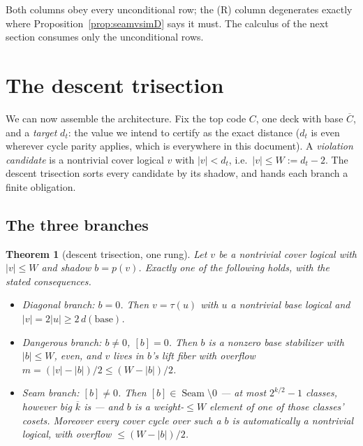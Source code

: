 \documentclass[11pt]{article}
\theoremstyle{plain}
\newtheorem{theorem}{Theorem}[section]
\theoremstyle{definition}
\theoremstyle{remark}
\newcommand{\Seam}{\operatorname{Seam}}
\newcommand{\base}{\mathrm{base}}
\newcommand{\wt}[1]{\lvert #1\rvert}
\newcommand{\ov}[1]{\overline{#1}}
\begin{document}
Both columns obey every unconditional row; the (R) column degenerates
exactly where Proposition~\ref{prop:seamvsimD} says it must. The
calculus of the next section consumes only the unconditional rows.

\section{The descent trisection}
\label{sec:trisection}

We can now assemble the architecture. Fix the top code $C$, one deck with
base $\ov C$, and a \emph{target} $d_t$: the value we intend to certify
as the exact distance ($d_t$ is even wherever cycle parity applies, which
is everywhere in this document). A \emph{violation candidate} is a
nontrivial cover logical $v$ with $\wt v < d_t$, i.e.\ $\wt v \leq W :=
d_t - 2$. The descent trisection sorts every candidate by its shadow, and
hands each branch a finite obligation.

\subsection{The three branches}

\begin{theorem}[descent trisection, one rung]\label{thm:trisection}
Let $v$ be a nontrivial cover logical with $\wt v \leq W$ and shadow $b =
p(v)$. Exactly one of the following holds, with the stated consequences.
\begin{itemize}[leftmargin=2.2em]
\item[\emph{(0)}] \emph{Diagonal branch: $b = 0$.} Then $v = \tau(u)$
  with $u$ a \emph{nontrivial} base logical and $\wt v = 2\wt u \geq
  2\,d(\base)$.
\item[\emph{(i)}] \emph{Dangerous branch: $b \neq 0$, $[b] = 0$.} Then
  $b$ is a nonzero base stabilizer with $\wt b \leq W$, even, and $v$
  lives in $b$'s lift fiber with overflow $m = (\wt v - \wt b)/2 \leq (W
  - \wt b)/2$.
\item[\emph{(ii)}] \emph{Seam branch: $[b] \neq 0$.} Then $[b] \in \Seam
  \setminus 0$ --- at most $2^{k/2} - 1$ classes, however big $\ov k$ is
  --- and $b$ is a weight-$\leq W$ element of one of those classes'
  cosets. Moreover \emph{every} cover cycle over such a $b$ is
  automatically a nontrivial logical, with overflow $\leq (W - \wt
  b)/2$.
\end{itemize}
\end{theorem}
\end{document}

